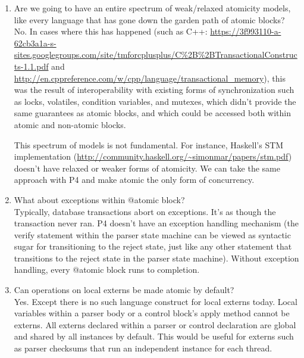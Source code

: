 \begin{enumerate}
\item Are we going to have an entire spectrum of weak/relaxed atomicity models,
like every language that has gone down the garden path of atomic blocks?\\
No. In cases where this has happened (such as C++:
\url{https://3f993110-a-62cb3a1a-s-sites.googlegroups.com/site/tmforcplusplus/C\%2B\%2BTransactionalConstructs-1.1.pdf}
and \url{http://en.cppreference.com/w/cpp/language/transactional\_memory}),
this was the result of interoperability with existing forms of synchronization
such as locks, volatiles, condition variables, and mutexes, which didn't
provide the same guarantees as atomic blocks, and which could be accessed both
within atomic and non-atomic blocks.

This spectrum of models is not fundamental. For instance, Haskell's STM
implementation (\url{http://community.haskell.org/~simonmar/papers/stm.pdf})
doesn't have relaxed or weaker forms of atomicity. We can take the same
approach with P4 and make atomic the only form of concurrency.

\item What about exceptions within @atomic block? \\
Typically, database transactions abort on exceptions.  It's as though the
transaction never ran. P4 doesn't have an exception handling mechanism (the
verify statement within the parser state machine can be viewed as syntactic
sugar for transitioning to the reject state, just like any other statement that
transitions to the reject state in the parser state machine). Without exception
handling, every @atomic block runs to completion.

\item Can operations on local externs be made atomic by default? \\
Yes. Except there is no such language construct for local externs today. Local
variables within a parser body or a control block's apply method cannot be
externs. All externs declared within a parser or control declaration are
global and shared by all instances by default. This would be useful for externs
such as parser checksums that run an independent instance for each thread.

\end{enumerate}
